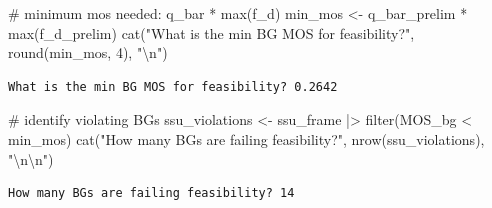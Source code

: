 \documentclass[
  11pt,
]{article}
\newenvironment{Shaded}{\begin{snugshade}}{\end{snugshade}}
\newcommand{\AttributeTok}[1]{\textcolor[rgb]{0.40,0.45,0.13}{#1}}
\newcommand{\CommentTok}[1]{\textcolor[rgb]{0.37,0.37,0.37}{#1}}
\newcommand{\DecValTok}[1]{\textcolor[rgb]{0.68,0.00,0.00}{#1}}
\newcommand{\FunctionTok}[1]{\textcolor[rgb]{0.28,0.35,0.67}{#1}}
\newcommand{\NormalTok}[1]{\textcolor[rgb]{0.00,0.23,0.31}{#1}}
\newcommand{\OtherTok}[1]{\textcolor[rgb]{0.00,0.23,0.31}{#1}}
\newcommand{\SpecialCharTok}[1]{\textcolor[rgb]{0.37,0.37,0.37}{#1}}
\newcommand{\StringTok}[1]{\textcolor[rgb]{0.13,0.47,0.30}{#1}}
\begin{document}
\begin{Shaded}
\begin{Highlighting}[]
\CommentTok{\# minimum mos needed: q\_bar * max(f\_d)}
\NormalTok{min\_mos }\OtherTok{\textless{}{-}}\NormalTok{ q\_bar\_prelim }\SpecialCharTok{*} \FunctionTok{max}\NormalTok{(f\_d\_prelim)}
\FunctionTok{cat}\NormalTok{(}\StringTok{"What is the min BG MOS for feasibility?"}\NormalTok{, }\FunctionTok{round}\NormalTok{(min\_mos, }\DecValTok{4}\NormalTok{), }\StringTok{"}\SpecialCharTok{\textbackslash{}n}\StringTok{"}\NormalTok{)}
\end{Highlighting}
\end{Shaded}

\begin{verbatim}
What is the min BG MOS for feasibility? 0.2642 
\end{verbatim}

\begin{Shaded}
\begin{Highlighting}[]
\CommentTok{\# identify violating BGs}
\NormalTok{ssu\_violations }\OtherTok{\textless{}{-}}\NormalTok{ ssu\_frame }\SpecialCharTok{|\textgreater{}} \FunctionTok{filter}\NormalTok{(MOS\_bg }\SpecialCharTok{\textless{}}\NormalTok{ min\_mos)}
\FunctionTok{cat}\NormalTok{(}\StringTok{"How many BGs are failing feasibility?"}\NormalTok{, }\FunctionTok{nrow}\NormalTok{(ssu\_violations), }\StringTok{"}\SpecialCharTok{\textbackslash{}n\textbackslash{}n}\StringTok{"}\NormalTok{)}
\end{Highlighting}
\end{Shaded}

\begin{verbatim}
How many BGs are failing feasibility? 14 
\end{verbatim}

\begin{Shaded}
\end{Shaded}
\end{document}
